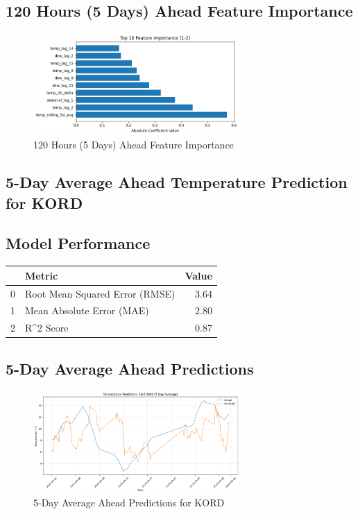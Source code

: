\subsection{120 Hours (5 Days) Ahead Feature Importance}
\begin{figure}[htbp]
\centering
\includegraphics[width=0.7\textwidth]{1-2-linear_temp_shift_feature_importance.png}
\caption{120 Hours (5 Days) Ahead Feature Importance}
\label{fig:120_hours_(5_days)_ahead_featimp}
\end{figure}



\subsection{5-Day Average Ahead Temperature Prediction for KORD}
\subsection{Model Performance}
\begin{tabular}{llr}
\toprule
 & Metric & Value \\
\midrule
0 & Root Mean Squared Error (RMSE) & 3.64 \\
1 & Mean Absolute Error (MAE) & 2.80 \\
2 & R^2 Score & 0.87 \\
\bottomrule
\end{tabular}

\subsection{5-Day Average Ahead Predictions}
\begin{figure}[htbp]
\centering
\includegraphics[width=0.7\textwidth]{1-3-linear_temp_shift_results.png}
\caption{5-Day Average Ahead Predictions for KORD}
\label{fig:5-day_average_ahead_pred}
\end{figure}


